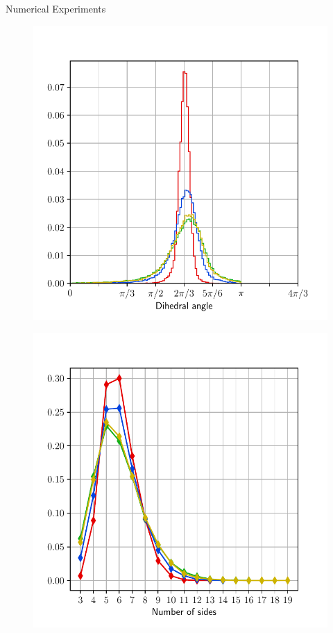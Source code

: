 \documentclass[usenames,dvipsnames]{beamer}
\begin{document}
\begin{frame}{Numerical Experiments}
\begin{minipage}{0.5\textwidth}
\begin{figure}
    \includegraphics[scale=0.45]{figures/coupled_model/new_data/ang.pdf}
\end{figure}
\end{minipage}%
\begin{minipage}{0.5\textwidth}
\begin{figure}
    \includegraphics[scale=0.45]{figures/coupled_model/new_data/nsides.pdf}
\end{figure}
\end{minipage}
\end{frame}
\end{document}

